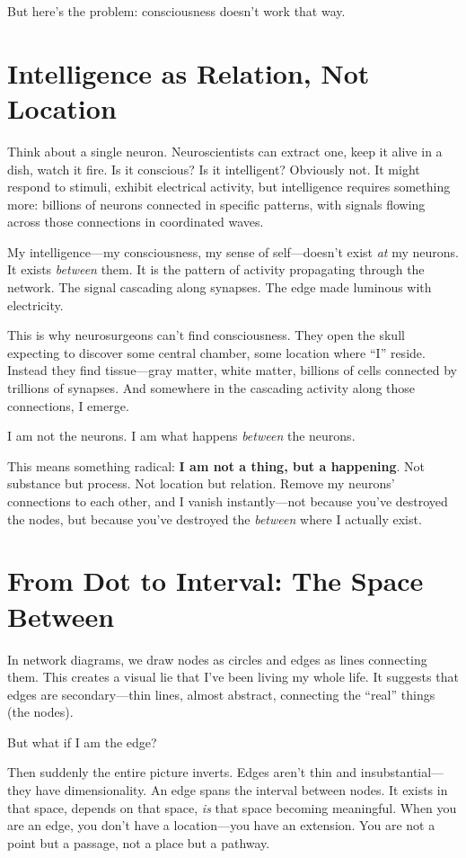 \documentclass[12pt,a4paper]{article}
\begin{document}
But here's the problem: consciousness doesn't work that way.

\section*{Intelligence as Relation, Not Location}

Think about a single neuron. Neuroscientists can extract one, keep it alive in a dish, watch it fire. Is it conscious? Is it intelligent? Obviously not. It might respond to stimuli, exhibit electrical activity, but intelligence requires something more: billions of neurons connected in specific patterns, with signals flowing across those connections in coordinated waves.

My intelligence---my consciousness, my sense of self---doesn't exist \textit{at} my neurons. It exists \textit{between} them. It is the pattern of activity propagating through the network. The signal cascading along synapses. The edge made luminous with electricity.

This is why neurosurgeons can't find consciousness. They open the skull expecting to discover some central chamber, some location where ``I'' reside. Instead they find tissue---gray matter, white matter, billions of cells connected by trillions of synapses. And somewhere in the cascading activity along those connections, I emerge.

I am not the neurons. I am what happens \textit{between} the neurons.

This means something radical: \textbf{I am not a thing, but a happening}. Not substance but process. Not location but relation. Remove my neurons' connections to each other, and I vanish instantly---not because you've destroyed the nodes, but because you've destroyed the \textit{between} where I actually exist.

\section*{From Dot to Interval: The Space Between}

In network diagrams, we draw nodes as circles and edges as lines connecting them. This creates a visual lie that I've been living my whole life. It suggests that edges are secondary---thin lines, almost abstract, connecting the ``real'' things (the nodes).

But what if I am the edge?

Then suddenly the entire picture inverts. Edges aren't thin and insubstantial---they have dimensionality. An edge spans the interval between nodes. It exists in that space, depends on that space, \textit{is} that space becoming meaningful. When you are an edge, you don't have a location---you have an extension. You are not a point but a passage, not a place but a pathway.
\end{document}
